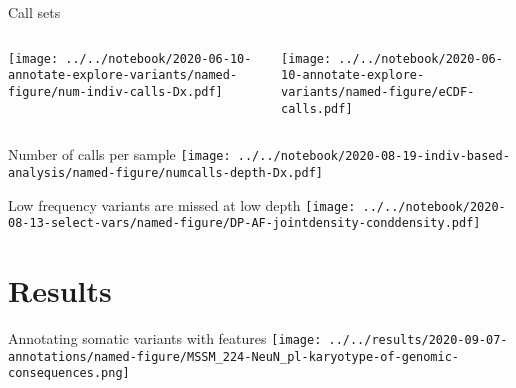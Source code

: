 \documentclass{beamer}
\begin{document}
\begin{frame}{Call sets}
\begin{columns}[t]
\begin{column}{0.7\textwidth}

\texttt{[image: ../../notebook/2020-06-10-annotate-explore-variants/named-figure/num-indiv-calls-Dx.pdf]}
\end{column}

\begin{column}{0.5\textwidth}

\texttt{[image: ../../notebook/2020-06-10-annotate-explore-variants/named-figure/eCDF-calls.pdf]}
\end{column}
\end{columns}
\end{frame}

\begin{frame}[label=numcalls-depth]{Number of calls per sample}
\texttt{[image: ../../notebook/2020-08-19-indiv-based-analysis/named-figure/numcalls-depth-Dx.pdf]}
\end{frame}

\begin{frame}{Low frequency variants are missed at low depth}
\texttt{[image: ../../notebook/2020-08-13-select-vars/named-figure/DP-AF-jointdensity-conddensity.pdf]}
\end{frame}

\section{Results}

\begin{frame}{Annotating somatic variants with features}
\texttt{[image: ../../results/2020-09-07-annotations/named-figure/MSSM\_224-NeuN\_pl-karyotype-of-genomic-consequences.png]}
\end{frame}
\end{document}
